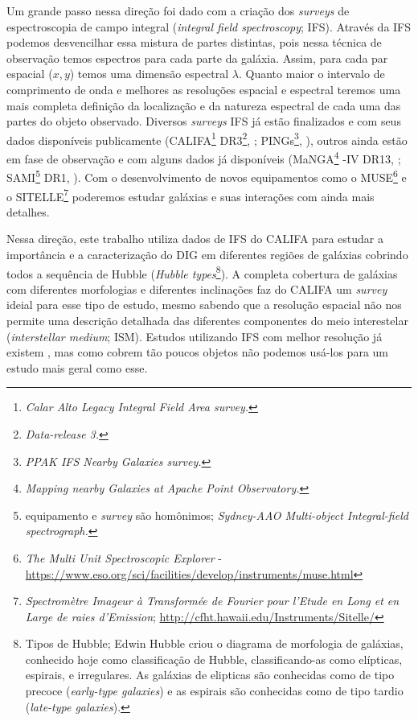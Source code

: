 Um grande passo nessa direção foi dado com a criação dos {\em surveys} de espectroscopia de campo integral ({\em integral field spectroscopy}; IFS). Através da IFS podemos desvencilhar essa mistura de partes distintas, pois nessa técnica de observação temos espectros para cada parte da galáxia. Assim, para cada par espacial ($x,y$) temos uma dimensão espectral $\lambda$. Quanto maior o intervalo de comprimento de onda e melhores as resoluções espacial e espectral teremos uma mais completa definição da localização e da natureza espectral de cada uma das partes do objeto observado. Diversos {\em surveys} IFS já estão finalizados e com seus dados disponíveis publicamente (CALIFA\footnote{\em Calar Alto Legacy Integral Field Area survey.} DR3\footnote{\em Data-release 3.}, \citealt{SFSanchez.DR3.2016}; PINGs\footnote{\em PPAK IFS Nearby Galaxies survey.}, \citealt{RosalesOrtega.etal.2010}), outros ainda estão em fase de observação e com alguns dados já disponíveis (MaNGA\footnote{\em Mapping nearby Galaxies at Apache Point Observatory.} \SDSS-IV DR13, \citealt{MaNGADR1.2017}; SAMI\footnote{equipamento e {\em survey} são homônimos; {\em Sydney-AAO Multi-object Integral-field spectrograph.}} DR1, \citealt{SAMIDR1.2017}). Com o desenvolvimento de novos equipamentos como o MUSE\footnote{{\em The Multi Unit Spectroscopic Explorer} - \href{https://www.eso.org/sci/facilities/develop/instruments/muse.html}{https://www.eso.org/sci/facilities/develop/instruments/muse.html}} e o SITELLE\footnote{{\em Spectromètre Imageur à Transformée de Fourier pour l'Etude en Long et en Large de raies d'Emission}; \href{http://cfht.hawaii.edu/Instruments/Sitelle/}{http://cfht.hawaii.edu/Instruments/Sitelle/}} poderemos estudar galáxias e suas interações com ainda mais detalhes.

Nessa direção, este trabalho utiliza dados de IFS do CALIFA para estudar a importância e a caracterização do DIG em diferentes regiões de galáxias cobrindo todos a sequência de Hubble ({\em Hubble types}\footnote{Tipos de Hubble; Edwin Hubble criou o diagrama de morfologia de galáxias, conhecido hoje como classificação de Hubble, classificando-as como elípticas, espirais, e irregulares. As galáxias de elipticas são conhecidas como de tipo precoce ({\em early-type galaxies}) e as espirais são conhecidas como de tipo tardio ({\em late-type galaxies}).}). A completa cobertura de galáxias com diferentes morfologias e diferentes inclinações faz do CALIFA um {\em survey} ideial para esse tipo de estudo, mesmo sabendo que a resolução espacial não nos permite uma descrição detalhada das diferentes componentes do meio interestelar ({\em interstellar medium}; ISM). Estudos utilizando IFS com melhor resolução já existem \citep{Sanchez.etal.2015MUSE, Vogt.etal.2017a, RousseauNepton.etal.2017}, mas como cobrem tão poucos objetos não podemos usá-los para um estudo mais geral como esse.


